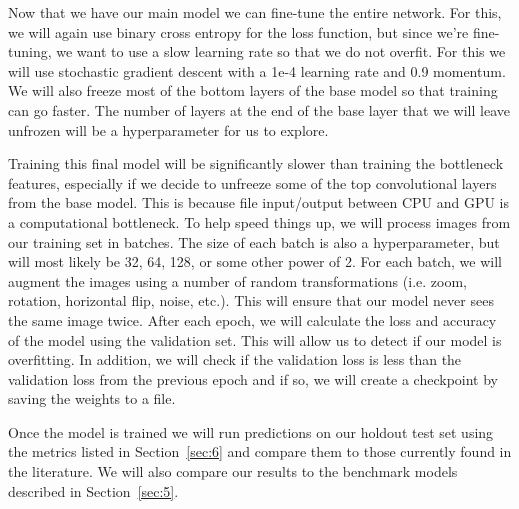 \documentclass[10pt, a4paper, twocolumn]{article} %
\begin{document}
Now that we have our main model we can fine-tune the entire network.  For this, we will again use binary cross entropy for the loss function, but since we're fine-tuning, we want to use a slow learning rate so that we do not overfit.  For this we will use stochastic gradient descent with a 1e-4 learning rate and 0.9 momentum. We will also freeze most of the bottom layers of the base model so that training can go faster.  The number of layers at the end of the base layer that we will leave unfrozen will be a hyperparameter for us to explore.

Training this final model will be significantly slower than training the bottleneck features, especially if we decide to unfreeze some of the top convolutional layers from the base model.  This is because file input/output between CPU and GPU is a computational bottleneck.  To help speed things up, we will process images from our training set in batches.  The size of each batch is also a hyperparameter, but will most likely be 32, 64, 128, or some other power of 2. For each batch, we will augment the images using a number of random transformations (i.e. zoom, rotation, horizontal flip, noise, etc.).  This will ensure that our model never sees the same image twice. After each epoch, we will calculate the loss and accuracy of the model using the validation set.  This will allow us to detect if our model is overfitting.  In addition, we will check if the validation loss is less than the validation loss from the previous epoch and if so, we will create a checkpoint by saving the weights to a file.

Once the model is trained we will run predictions on our holdout test set using the metrics listed in Section~\ref{sec:6} and compare them to those currently found in the literature.  We will also compare our results to the benchmark models described in Section~\ref{sec:5}.


\end{document}
